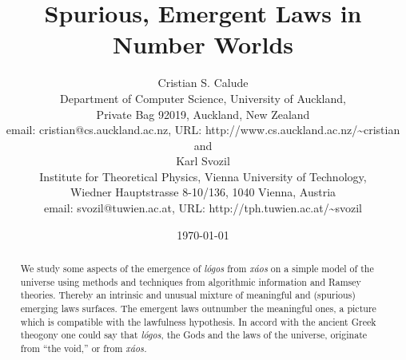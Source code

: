 \documentclass[12pt]{article}
\begin{document}
\title{Spurious, Emergent Laws in Number Worlds}

\author{Cristian S. Calude \\
        {\small   Department of Computer Science, University of Auckland,} \\
        {\small   Private Bag 92019, Auckland, New Zealand}  \\
        {\small   email: cristian@cs.auckland.ac.nz, URL: http://www.cs.auckland.ac.nz/{\textasciitilde}cristian}\\
        and  \\
        Karl Svozil \\
        {\small   Institute for Theoretical Physics, Vienna University of Technology,} \\
        {\small   Wiedner Hauptstrasse 8-10/136, 1040 Vienna, Austria}\\
        {\small   email: svozil@tuwien.ac.at, URL: http://tph.tuwien.ac.at/{\textasciitilde}svozil}
        }

\date{\today}

\maketitle

\thispagestyle{empty}
\begin{abstract}
We study some aspects of the emergence of {\it l\'ogos} from {\it x\'aos} on a simple model of the universe using methods and techniques from algorithmic information and Ramsey theories. Thereby an intrinsic and unusual mixture of meaningful and (spurious) emerging laws surfaces. The emergent laws outnumber the meaningful ones, a picture which is compatible with the lawfulness hypothesis.  In accord with the ancient Greek theogony one could say that {\it l\'ogos}, the Gods and the laws of the universe, originate from ``the void,'' or from {\it x\'aos.}
\end{abstract}
\end{document}
